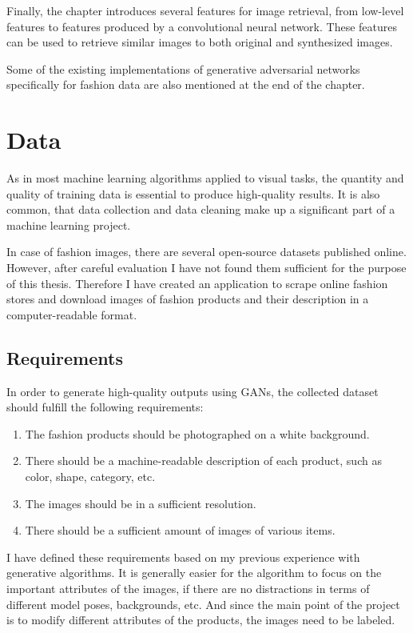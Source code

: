 \documentclass[12pt]{report}
\begin{document}
Finally, the chapter introduces several features for image retrieval, from low-level features to features produced by a convolutional neural network. These features can be used to retrieve similar images to both original and synthesized images.

Some of the existing implementations of generative adversarial networks specifically for fashion data are also mentioned at the end of the chapter.

\section{Data} \label{sec:data}
As in most machine learning algorithms applied to visual tasks, the quantity and quality of training data is essential to produce high-quality results. It is also common, that data collection and data cleaning make up a significant part of a machine learning project.

In case of fashion images, there are several open-source datasets published online. However, after careful evaluation I have not found them sufficient for the purpose of this thesis. Therefore I have created an application to scrape online fashion stores and download images of fashion products and their description in a computer-readable format.

\pagebreak
\subsection{Requirements}

In order to generate high-quality outputs using GANs, the collected dataset should fulfill the following requirements:
\begin{enumerate}
\item The fashion products should be photographed on a white background. 
\item There should be a machine-readable description of each product, such as color, shape, category, etc. 
\item The images should be in a sufficient resolution.
\item There should be a sufficient amount of images of various items.

\end{enumerate}
I have defined these requirements based on my previous experience with generative algorithms. It is generally easier for the algorithm to focus on the important attributes of the images, if there are no distractions in terms of different model poses, backgrounds, etc. And since the main point of the project is to modify different attributes of the products, the images need to be labeled.
\end{document}
